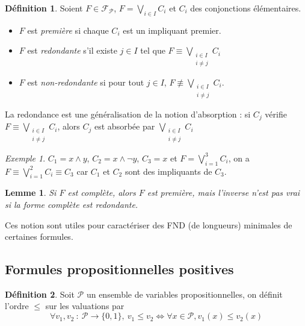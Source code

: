 \documentclass[]{article}
\newtheorem{mylemma}{Lemme}
\theoremstyle{remark}
\newtheorem{myexmpl}{Exemple}
\theoremstyle{definition}
\newtheorem{mydef}{Définition}
\newcommand{\funcshort}[3]{
#1 ~ : ~ #2 \longrightarrow #3
}
\begin{document}
\begin{mydef}
	Soient $F \in \mathcal{F}_{\mathcal{P}}$, $F = \bigvee\limits_{i \in I} C_i$ et $C_i$ des conjonctions élémentaires.
	
	\begin{itemize}
		\item $F$ est \textit{première} si chaque $C_i$ est un impliquant premier.
		\item $F$ est \textit{redondante} s'il existe $j \in I$ tel que $F \equiv \bigvee\limits_{\substack{i \in I \\ i \neq j}} C_i$
		
		\item $F$ est \textit{non-redondante} si pour tout $j \in I$, $F \not\equiv \bigvee\limits_{\substack{i \in I \\ i \neq j}} C_i$.
	\end{itemize}
\end{mydef}

La redondance est une généralisation de la notion d'absorption : si $C_j$ vérifie $F \equiv \bigvee\limits_{\substack{i \in I \\ i \neq j}} C_i$, alors $C_j$ est absorbée par $\bigvee\limits_{\substack{i \in I \\ i \neq j}} C_i$

\begin{myexmpl}
	$C_1 = x \land y$, $C_2 = x \land \neg y$, $C_3 = x$ et $F = \bigvee\limits_{i=1}^3 C_i$, on a $F \equiv \bigvee\limits_{i=1}^2 C_i \equiv C_3$ car $C_1$ et $C_2$ sont des impliquants de $C_3$.
\end{myexmpl}

\begin{mylemma}
	Si $F$ est complète, alors $F$ est première, mais l'inverse n'est pas vrai si la forme complète est redondante.
\end{mylemma}

Ces notion sont utiles pour caractériser des FND (de longueurs) minimales de certaines formules.

\subsection{Formules propositionnelles positives}

\begin{mydef}
	Soit $\mathcal{P}$ un ensemble de variables propositionnelles, on définit l'ordre $\leqslant$ sur les valuations par $$\forall \funcshort{v_1, v_2}{\mathcal{P}}{\{0, 1\}}, ~ v_1 \leqslant v_2 \Longleftrightarrow \forall x \in \mathcal{P}, v_1(x) \leqslant v_2(x)$$
\end{mydef}
\end{document}
